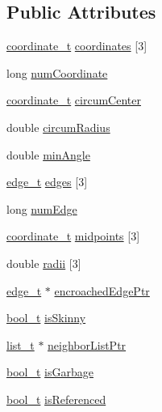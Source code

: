 \subsection*{Public Attributes}
\begin{DoxyCompactItemize}
\item 
\hyperlink{labyrinth_2coordinate_8h_ab8828f39e3b8bce05f072dc54206a25c}{coordinate\-\_\-t} \hyperlink{structelement_a4ad4052bfef08c7371b665e6cc99b6f6}{coordinates} \mbox{[}3\mbox{]}
\item 
long \hyperlink{structelement_a71de062e2f8663f24aae204c885c742d}{num\-Coordinate}
\item 
\hyperlink{labyrinth_2coordinate_8h_ab8828f39e3b8bce05f072dc54206a25c}{coordinate\-\_\-t} \hyperlink{structelement_a4212bfb7df529f767e2b9acbced3c71c}{circum\-Center}
\item 
double \hyperlink{structelement_a697553df37ab4269126d4ee1f3f3a2b2}{circum\-Radius}
\item 
double \hyperlink{structelement_ab586b96975a99e94ced900e0eed1d8d9}{min\-Angle}
\item 
\hyperlink{element_8h_aedb20c9c3aef6f612ef2df5780639744}{edge\-\_\-t} \hyperlink{structelement_a07ee3a59552f0477a1a887b8853257bd}{edges} \mbox{[}3\mbox{]}
\item 
long \hyperlink{structelement_a8ad055608ad3d505d0804e73be8a6743}{num\-Edge}
\item 
\hyperlink{labyrinth_2coordinate_8h_ab8828f39e3b8bce05f072dc54206a25c}{coordinate\-\_\-t} \hyperlink{structelement_a7eeb56ed178350f0375260f390c33637}{midpoints} \mbox{[}3\mbox{]}
\item 
double \hyperlink{structelement_abc3766172dedc7a996146e4902c22b6e}{radii} \mbox{[}3\mbox{]}
\item 
\hyperlink{element_8h_aedb20c9c3aef6f612ef2df5780639744}{edge\-\_\-t} $\ast$ \hyperlink{structelement_a13e83b80790f5b770e39520e403dab17}{encroached\-Edge\-Ptr}
\item 
\hyperlink{portable__defns_8h_a812d16e5494522586b3784e55d479912}{bool\-\_\-t} \hyperlink{structelement_ab99517195f633dce193a6f2cb7fb3840}{is\-Skinny}
\item 
\hyperlink{list_8h_af629e6a6713d7de11eab50cbe6449b06}{list\-\_\-t} $\ast$ \hyperlink{structelement_a8296a589f39bad6cd04cd51de291be85}{neighbor\-List\-Ptr}
\item 
\hyperlink{portable__defns_8h_a812d16e5494522586b3784e55d479912}{bool\-\_\-t} \hyperlink{structelement_a864b0ad7c955222169ad1cafe3631a0d}{is\-Garbage}
\item 
\hyperlink{portable__defns_8h_a812d16e5494522586b3784e55d479912}{bool\-\_\-t} \hyperlink{structelement_a94badfa41f82fe97086c6e66544ee5fc}{is\-Referenced}
\end{DoxyCompactItemize}


